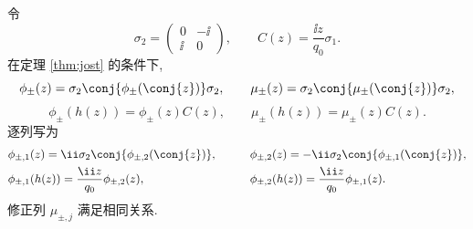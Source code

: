 \begin{proposition}\label{prop:symmetry}
令
\[
\sigma_2=\begin{pmatrix}0&-\ii\\\ii&0\end{pmatrix},\qquad
C(z)=\dfrac{\ii z}{q_0}\sigma_1.
\]
在定理 \ref{thm:jost} 的条件下,
\begin{equation}\label{eq:conjugation}
\phi_\pm(z)=\sigma_2\conj{\phi_\pm(\conj{z})}\sigma_2,\qquad
\mu_\pm(z)=\sigma_2\conj{\mu_\pm(\conj{z})}\sigma_2,
\end{equation}
\begin{equation}\label{eq:musheet}
\phi_\pm(h(z))=\phi_\pm(z)C(z),\qquad
\mu_\pm(h(z))=\mu_\pm(z)C(z).
\end{equation}
逐列写为
\begin{alignat}{2}
&\phi_{\pm,1}(z)=\ii\sigma_2\conj{\phi_{\pm,2}(\conj{z})},&\qquad
&\phi_{\pm,2}(z)=-\ii\sigma_2\conj{\phi_{\pm,1}(\conj{z})},\label{eq:jost-conjugate-columns}\\
&\phi_{\pm,1}(h(z))=\dfrac{\ii z}{q_0}\phi_{\pm,2}(z),&\qquad
&\phi_{\pm,2}(h(z))=\dfrac{\ii z}{q_0}\phi_{\pm,1}(z).\label{eq:jost-sheet-columns}
\end{alignat}
修正列 $\mu_{\pm,j}$ 满足相同关系.
\end{proposition}
